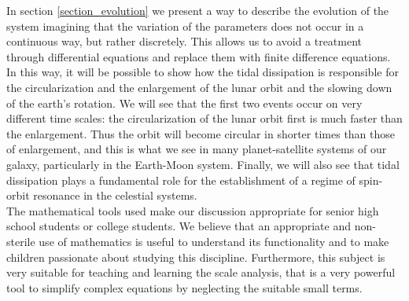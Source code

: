 \documentclass[11pt, oneside,reqno]{amsart}
\begin{document}
In section \ref{section_evolution} we present a way to describe the evolution of the system imagining that the variation of the parameters does not occur in a continuous way, but rather discretely. This allows us to avoid a treatment through differential equations and replace them with finite difference equations.\\
In this way, it will be possible to show how the tidal dissipation is responsible for the circularization and the enlargement of the lunar orbit and the slowing down of the earth's rotation. We will see that the first two events occur on very different time scales: the circularization of the lunar orbit first is much faster than the enlargement. Thus the orbit will become circular in shorter times than those of enlargement, and this is what we see in many planet-satellite systems of our galaxy, particularly in the Earth-Moon system. Finally, we will also see that tidal dissipation plays a fundamental role for the establishment of a regime of spin-orbit resonance in the celestial systems.\\
The mathematical tools used make our discussion appropriate for senior high school students or college students. We believe that an appropriate and non-sterile use of mathematics is useful to understand its functionality and to make children passionate about studying this discipline. Furthermore, this subject is very suitable for teaching and learning the scale analysis, that is a very powerful tool to simplify complex equations by neglecting the suitable small terms.
\end{document}
